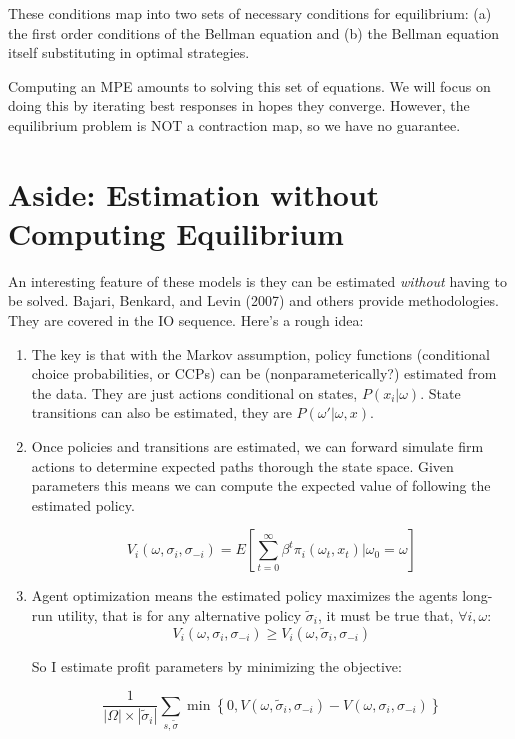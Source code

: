 \documentclass[twoside]{article}
\begin{document}
 These conditions map into two sets of necessary conditions for equilibrium: (a) the first order conditions of the Bellman equation and (b) the Bellman equation itself substituting in optimal strategies. 
 
Computing an MPE amounts to solving this set of equations. We will focus on doing this by iterating best responses in hopes they converge.  However, the equilibrium problem is NOT a contraction map, so we have no guarantee. 

\section{Aside: Estimation without Computing Equilibrium}

An interesting feature of these models is they can be estimated \emph{without} having to be solved.  Bajari, Benkard, and Levin (2007) and others provide methodologies. They are covered in the IO sequence.  Here's a rough idea: 

\begin{enumerate}
\item The key is that with the Markov assumption, policy functions (conditional choice probabilities, or CCPs) can be (nonparameterically?) estimated from the data. They are just actions conditional on states, $P(x_i|\omega)$. State transitions can also be estimated, they are $P(\omega'|\omega, x)$. 

\item Once policies and transitions are estimated, we can forward simulate firm actions to determine expected paths thorough the state space. Given parameters this means we can compute the expected value of following the estimated policy. 

$$V_i(\omega, \sigma_i, \sigma_{-i}) = E \left[ \sum_{t = 0}^\infty \beta^t \pi_i(\omega_t, x_t) | \omega_0 = \omega \right] $$

\item Agent optimization means the estimated policy maximizes the agents long-run utility, that is for any alternative policy $\tilde{\sigma}_i$, it must be true that, $\forall i, \omega$: 
$$V_i(\omega, \sigma_i, \sigma_{-i}) \geq V_i(\omega, \tilde{\sigma}_i, \sigma_{-i})  $$

So I estimate profit parameters by minimizing the objective:

$$  \frac{1}{|\Omega | \times | \tilde{\sigma}_i | } \sum_{s, \tilde{\sigma}} \min \left\{ 0, V(\omega, \tilde{\sigma}_i, \sigma_{-i}) - V(\omega, \sigma_i, \sigma_{-i}) \right\} $$

\end{enumerate}
\end{document}
